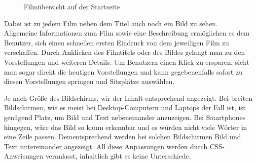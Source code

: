 \begin{figure}[ht]
{	\label{fig:startseite02}}
	\caption{Filmübersicht auf der Startseite}
\end{figure}

Dabei ist zu jedem Film neben dem Titel auch noch ein Bild zu sehen.
Allgemeine Informationen zum Film sowie eine Beschreibung ermöglichen es dem Benutzer, sich einen schnellen ersten Eindruck von dem jeweiligen Film zu verschaffen.
Durch Anklicken des Filmtitels oder des Bildes gelangt man zu den Vorstellungen und weiteren Details.
Um Benutzern einen Klick zu ersparen, sieht man sogar direkt die heutigen Vorstellungen und kann gegebenenfalls sofort zu diesen Vorstellungen springen und Sitzplätze auswählen.

Je nach Größe des Bildschirms, wir der Inhalt entsprechend angezeigt.
Bei breiten Bildschirmen, wie es meist bei Desktop-Computern und Laptops der Fall ist, ist genügend Platz, um Bild und Text nebeneinander anzuzeigen.
Bei Smartphones hingegen, wäre das Bild so kaum erkennbar und es würden nicht viele Wörter in eine Zeile passen.
Dementsprechend werden bei solchen Bildschirmen Bild und Text untereinander angezeigt.
All diese Anpassungen werden durch \acs{CSS}-Anweisungen veranlasst, inhaltlich gibt es keine Unterschiede.
